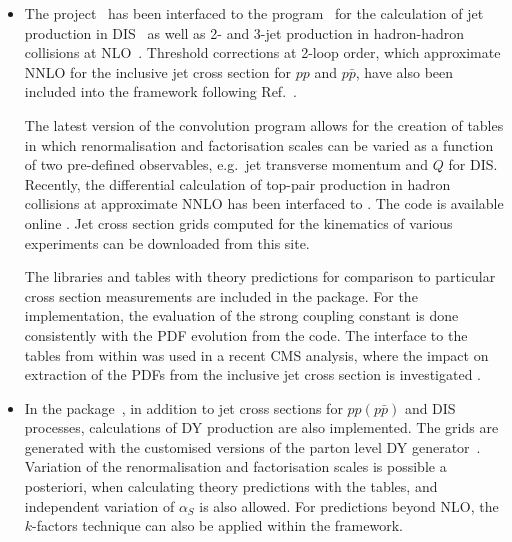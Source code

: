 \begin{itemize}
  \item The \fastnlo project~\cite{Kluge:2006xs} has been interfaced
    to the \nlojetpp program~\cite{Nagy:1998bb} for the calculation of
    jet production in DIS~\cite{Nagy:2001xb} as well as 2- and 3-jet
    production in hadron-hadron collisions at
    NLO~\cite{Nagy:2003tz,Nagy:2001fj}.  Threshold corrections at 2-loop
    order, which approximate NNLO for the inclusive jet cross
    section for $pp$ and $p\bar p$, have also been included into the framework \cite{Wobisch:2011ij} 
    following Ref.~\cite{Kidonakis:2000gi}.

    The latest version of the \fastnlo convolution program \cite{Britzger:2012bs} allows for the
    creation of tables in which renormalisation and factorisation scales
    can be varied as a function of two pre-defined observables, e.g.\ jet
    transverse momentum \pperp and $Q$ for DIS\@. 
    Recently, the differential calculation of top-pair production in hadron collisions 
    at approximate NNLO \cite{Guzzi:2014wia} has been interfaced to \fastnlo \cite{dis2014Fast}.
    The \fastnlo code is available online \cite{fastNLO:HepForge}.
    Jet cross section grids computed for the kinematics of various experiments
    can be downloaded from this site.

    The \fastnlo libraries and tables with theory predictions for comparison to
    particular cross section measurements are included in the \fitter package. 
    For the \fitter implementation, the evaluation of the strong coupling constant is done
    consistently with the PDF evolution from the \qcdnum code. 
    The interface to the \fastnlo tables from within \fitter was used in a recent
    CMS analysis, where the impact on extraction of the PDFs from the inclusive 
    jet cross section is investigated \cite{Khachatryan:2014waa}.
\\
\item In the \applgrid package~\cite{Carli:2010rw,APPLGRID:HepForge},
    in addition to jet cross sections for
    $pp(p\bar p)$ and DIS processes, calculations 
    of DY production are also implemented. The grids are generated with
    the customised versions of the \mcfm parton level DY
    generator~\cite{Campbell:1999ah,Campbell:2000je,Campbell:2010ff}.
    Variation of the renormalisation and factorisation scales is possible a posteriori,
    when calculating theory predictions with the \applgrid  tables, and
    independent variation of $\alpha_S$ is also allowed.
    For predictions beyond NLO, the $k$-factors technique can also be applied
    within the \applgrid framework.


\end{itemize}
